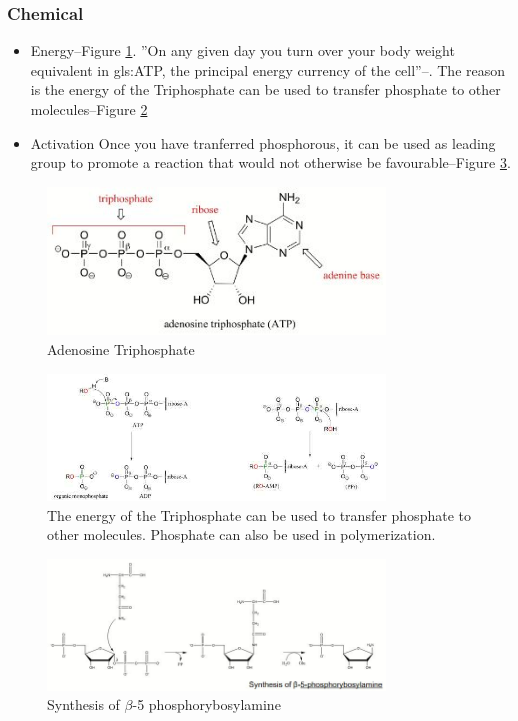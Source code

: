\documentclass[]{article}
\begin{document}
\subsubsection{Chemical}

\begin{itemize}
	\item Energy--Figure \ref{fig:ATP}. ''On any given day you turn over your body weight equivalent in \gls{gls:ATP}, the principal energy currency of the cell''--\cite{tornroth2008opening}. The reason is the energy of the Triphosphate can be used to transfer phosphate to other molecules--Figure \ref{fig:ATP1}
	\item Activation Once you have tranferred phosphorous, it can be used as leading group to promote a reaction that would not otherwise be favourable--Figure \ref{fig:Synthesis-beta-5-phosphorybosylamine}. 
\end{itemize}

\begin{figure}[H]
	\caption{Adenosine Triphosphate}\label{fig:ATP}
	\includegraphics[width=0.8\textwidth]{ATP}
\end{figure}

\begin{figure}[H]
	\caption[ATP transferring phosphate to other molecules]{The energy of the Triphosphate can be used to transfer phosphate to other molecules. Phosphate can also be used in polymerization.}\label{fig:ATP1}
	\includegraphics[width=0.8\textwidth]{ATP1}
\end{figure}

\begin{figure}[H]
	\caption{Synthesis of $\beta$-5 phosphorybosylamine}\label{fig:Synthesis-beta-5-phosphorybosylamine}
	\includegraphics[width=0.8\textwidth]{Synthesis-beta-5-phosphorybosylamine}
\end{figure}
\end{document}
